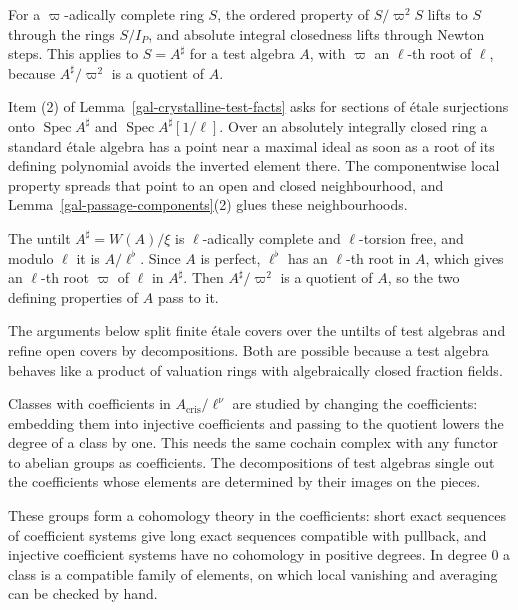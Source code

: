 For a $\varpi$-adically complete ring $S$, the ordered property of $S/\varpi^2S$ lifts to $S$ through
the rings $S/I_P$, and absolute integral closedness lifts through Newton steps. This applies to
$S=A^\sharp$ for a test algebra $A$, with $\varpi$ an $\ell$-th root of $\ell$, because
$A^\sharp/\varpi^2$ is a quotient of $A$.

Item (2) of Lemma~\ref{gal-crystalline-test-facts} asks for sections of \'etale surjections onto
$\operatorname{Spec}A^\sharp$ and $\operatorname{Spec}A^\sharp[1/\ell]$. Over an absolutely integrally
closed ring a standard \'etale algebra has a point near a maximal ideal as soon as a root of its
defining polynomial avoids the inverted element there. The componentwise local property spreads that
point to an open and closed neighbourhood, and Lemma~\ref{gal-passage-components}(2) glues these
neighbourhoods.

The untilt $A^\sharp=W(A)/\xi$ is $\ell$-adically complete and $\ell$-torsion free, and modulo $\ell$
it is $A/\ell^\flat$. Since $A$ is perfect, $\ell^\flat$ has an $\ell$-th root in $A$, which gives an
$\ell$-th root $\varpi$ of $\ell$ in $A^\sharp$. Then $A^\sharp/\varpi^2$ is a quotient of $A$, so the
two defining properties of $A$ pass to it.

The arguments below split finite \'etale covers over the untilts of test algebras and refine open
covers by decompositions. Both are possible because a test algebra behaves like a product of valuation
rings with algebraically closed fraction fields.

Classes with coefficients in $A_{\mathrm{cris}}/\ell^\nu$ are studied by changing the coefficients:
embedding them into injective coefficients and passing to the quotient lowers the degree of a class by
one. This needs the same cochain complex with any functor to abelian groups as coefficients. The
decompositions of test algebras single out the coefficients whose elements are determined by their
images on the pieces.

These groups form a cohomology theory in the coefficients: short exact sequences of coefficient systems
give long exact sequences compatible with pullback, and injective coefficient systems have no
cohomology in positive degrees. In degree $0$ a class is a compatible family of elements, on which local
vanishing and averaging can be checked by hand.

